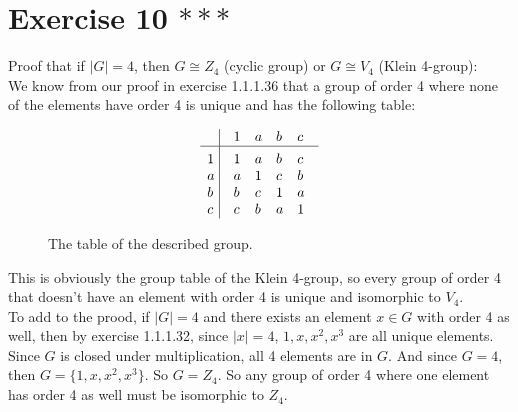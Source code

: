 \documentclass[12pt]{article}
\begin{document}
    \section*{Exercise 10 $***$}
    Proof that if $|G| = 4$, 
    then $G \cong Z_4$ (cyclic group) or $G \cong V_4$ (Klein 4-group): \\
    We know from our proof in exercise 1.1.1.36 that a group
    of order 4 where none of the elements have order 4
    is unique and has the following table:
    \begin{figure}[H]
        \centering

        \[\vbox{\tabskip0.5em\offinterlineskip
        \halign{\strut$#$\hfil\ \tabskip1em\vrule&&$#$\hfil\cr
        ~   & 1   & a   & b & c \cr
        \noalign{\hrule}\vrule height 12pt width 0pt
        1   & 1 & a & b & c \cr 
        a   & a & 1 & c & b \cr 
        b   & b & c & 1 & a \cr 
        c   & c & b & a & 1 \cr
        }}\]

        \caption{\label{fig:figure1} The table of the described group.}
    \end{figure}
    
    This is obviously the group table of the Klein 4-group,
    so every group of order 4 that doesn't have
    an element with order 4 is unique and isomorphic to $V_4$. \\
    To add to the prood, if $|G| = 4$ and there exists
    an element $x \in G$ with order 4 as well,
    then by exercise 1.1.1.32, since $|x| = 4$,
    $1, x, x^2, x^3$ are all unique elements.
    Since $G$ is closed under multiplication,
    all 4 elements are in $G$.
    And since $G = 4$, then $G = \{1, x, x^2, x^3\}$.
    So $G = Z_4$.
    So any group of order 4 where one element has order 4 as well
    must be isomorphic to $Z_4$.
\end{document}
